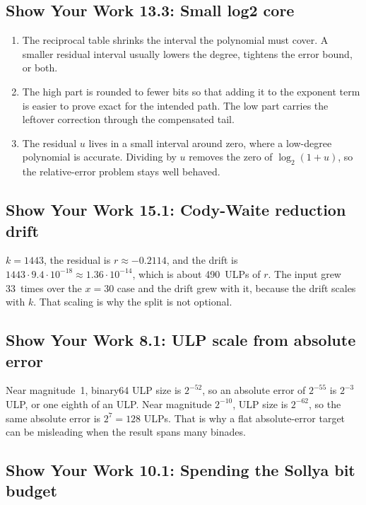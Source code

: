 \documentclass[manuscript, nonacm]{acmart}
\begin{document}
    \subsection*{Show Your Work 13.3: Small log2 core}

    \begin{enumerate}
        \item The reciprocal table shrinks the interval the polynomial must cover.
        A smaller residual interval usually lowers the degree, tightens the error
        bound, or both.
        \item The high part is rounded to fewer bits so that adding it to the
        exponent term is easier to prove exact for the intended path. The low part
        carries the leftover correction through the compensated tail.
        \item The residual $u$ lives in a small interval around zero, where a
        low-degree polynomial is accurate. Dividing by $u$ removes the zero of
        $\log_2(1 + u)$, so the relative-error problem stays well behaved.
    \end{enumerate}

    \subsection*{Show Your Work 15.1: Cody-Waite reduction drift}

    $k = 1443$, the residual is $r \approx -0.2114$, and the drift is
    $1443 \cdot 9.4 \cdot 10^{-18} \approx 1.36 \cdot 10^{-14}$, which is
    about 490~ULPs of $r$. The input grew 33~times over the $x = 30$ case and
    the drift grew with it, because the drift scales with $k$. That scaling is
    why the split is not optional.

    \subsection*{Show Your Work 8.1: ULP scale from absolute error}

    Near magnitude~1, binary64 ULP size is $2^{-52}$, so an absolute error of
    $2^{-55}$ is $2^{-3}$ ULP, or one eighth of an ULP. Near magnitude $2^{-10}$,
    ULP size is $2^{-62}$, so the same absolute error is $2^7 = 128$ ULPs. That is
    why a flat absolute-error target can be misleading when the result spans many
    binades.

    \subsection*{Show Your Work 10.1: Spending the Sollya bit budget}
\end{document}
